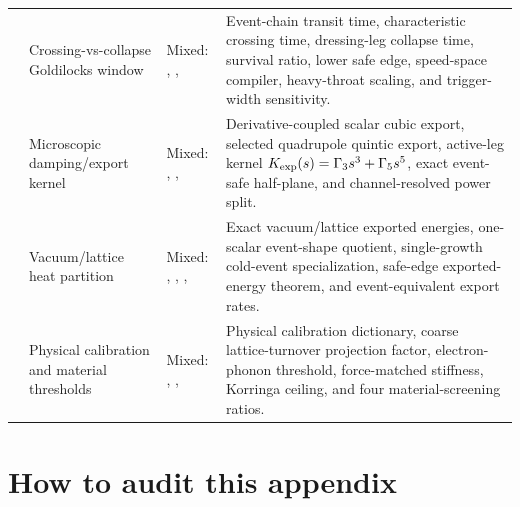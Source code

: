 \begin{longtable}{@{}L{0.075\textwidth}L{0.35\textwidth}L{0.20\textwidth}L{0.325\textwidth}@{}}
 & Crossing-vs-collapse Goldilocks window & Mixed: \StatusExactClosure{}, \StatusEffective{}, \StatusNumerical{} & Event-chain transit time, characteristic crossing time, dressing-leg collapse time, survival ratio, lower safe edge, speed-space compiler, heavy-throat scaling, and trigger-width sensitivity. \\
 & Microscopic damping/export kernel & Mixed: \StatusExactClosure{}, \StatusReduced{}, \StatusOpen{} & Derivative-coupled scalar cubic export, selected quadrupole quintic export, active-leg kernel \(K_{\rm exp}(s)=\Gamma_3s^3+\Gamma_5s^5\), exact event-safe half-plane, and channel-resolved power split. \\
 & Vacuum/lattice heat partition & Mixed: \StatusExactClosure{}, \StatusEffective{}, \StatusNumerical{}, \StatusOpen{} & Exact vacuum/lattice exported energies, one-scalar event-shape quotient, single-growth cold-event specialization, safe-edge exported-energy theorem, and event-equivalent export rates. \\
 & Physical calibration and material thresholds & Mixed: \StatusExactClosure{}, \StatusEffective{}, \StatusOpen{} & Physical calibration dictionary, coarse lattice-turnover projection factor, electron-phonon threshold, force-matched stiffness, Korringa ceiling, and four material-screening ratios. \\
\bottomrule
\end{longtable}


\section{How to audit this appendix}
\label{sec:app-part08-audit-method}

